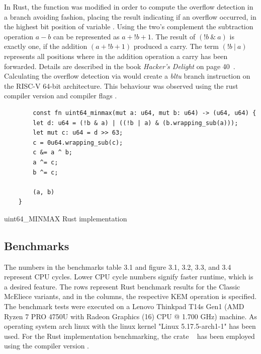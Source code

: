 \documentclass[11pt,
  oneside,openany,    %
]{scrreprt}
\begin{document}
In Rust, the function was modified in order to compute the overflow detection in a branch avoiding fashion, placing the result indicating if an overflow occurred, in the highest bit position of variable . Using the two's complement the subtraction operation $a - b$ can be represented as $a + !b + 1$. The result of $(!b \ \& \ a)$ is exactly one, if the addition $(a + !b + 1)$ produced a carry. The term $(!b \ | \ a)$ represents all positions where in the addition operation a carry has been forwarded. Details are described in the book \textit{Hacker's Delight} on page 40~\cite{hackersDelight}. Calculating the overflow detection via  would create a \textit{bltu} branch instruction on the RISC-V 64-bit architecture. This behaviour was observed using the rust compiler version  and compiler flags .

\begin{listing}[H]
\begin{verbatim}
        const fn uint64_minmax(mut a: u64, mut b: u64) -> (u64, u64) {
        let d: u64 = (!b & a) | ((!b | a) & (b.wrapping_sub(a)));
        let mut c: u64 = d >> 63;
        c = 0u64.wrapping_sub(c);
        c &= a ^ b;
        a ^= c;
        b ^= c;
    
        (a, b)
    }
\end{verbatim}
  \caption{uint64\_MINMAX Rust implementation}
  \label{list:uint64_minmax_Rust}
\end{listing}

\subsection{Benchmarks}

The numbers in the benchmarks table 3.1 and figure 3.1, 3.2, 3.3, and 3.4 represent CPU cycles. Lower CPU cycle numbers signify faster runtime, which is a desired feature. The rows represent Rust benchmark results for the Classic McEliece variants, and in the columns, the respective KEM operation is specified. The benchmark tests were executed on a Lenovo Thinkpad T14s Gen1 (AMD Ryzen 7 PRO 4750U with Radeon Graphics (16) CPU @ 1.700 GHz) machine. As operating system arch linux with the linux kernel "Linux 5.17.5-arch1-1" has been used. For the Rust implementation benchmarking, the crate ~\cite{rustBenchmarkLib} has been employed using the compiler version .
\end{document}
